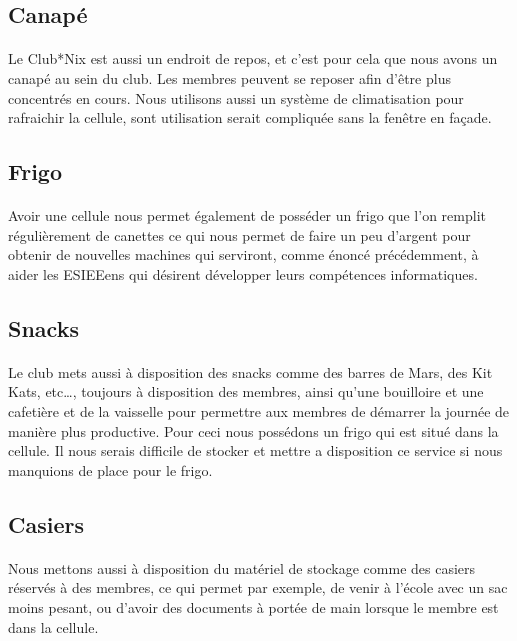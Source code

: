 \documentclass[11pt]{report}
\begin{document}
\subsection{Canapé}
\paragraph{} Le Club*Nix est aussi un endroit de repos, et c'est pour cela que
nous avons un canapé au sein du club. Les membres peuvent se reposer afin
d'être plus concentrés en cours. Nous utilisons aussi un système de
climatisation pour rafraichir la cellule, sont utilisation serait compliquée
sans la fenêtre en façade.

\subsection{Frigo}
\paragraph{} Avoir une cellule nous permet également de posséder un frigo que
l'on remplit régulièrement de canettes ce qui nous permet de faire un peu
d'argent pour obtenir de nouvelles machines qui serviront, comme énoncé
précédemment, à aider les ESIEEens qui désirent développer leurs compétences
informatiques.

\subsection{Snacks}
\paragraph{} Le club mets aussi à disposition des snacks comme des barres de
Mars, des Kit Kats, etc\ldots, toujours à disposition des membres, ainsi qu'une
bouilloire et une cafetière et de la vaisselle pour permettre aux membres de
démarrer la journée de manière plus productive. Pour ceci nous possédons un
frigo qui est situé dans la cellule. Il nous serais difficile de stocker et
mettre a disposition ce service si nous manquions de place pour le frigo. 

\subsection{Casiers}
\paragraph{} Nous mettons aussi à disposition du matériel de stockage comme des
casiers réservés à des membres, ce qui permet par exemple, de venir à l'école
avec un sac moins pesant, ou d'avoir des documents à portée de main lorsque le
membre est dans la cellule.
\end{document}
